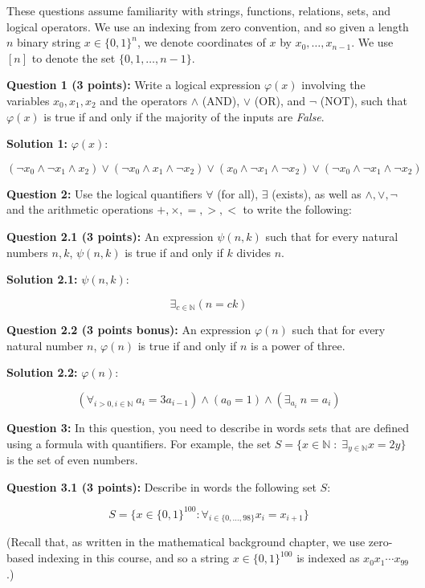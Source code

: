\documentclass[11pt]{article}
\newcommand{\N}{\ensuremath{\mathbb{N}}}
\begin{document}
These questions assume familiarity with strings, functions, relations,
sets, and logical operators. We use an indexing from zero convention,
and so given a length \(n\) binary string \(x\in \{0,1\}^n\), we denote
coordinates of \(x\) by \(x_0,\ldots,x_{n-1}\). We use \([n]\) to denote
the set \(\{0,1,\ldots,n-1\}\).

\textbf{Question 1 (3 points):} Write a logical expression
\(\varphi(x)\) involving the variables \(x_0,x_1,x_2\) and the operators
\(\wedge\) (AND), \(\vee\) (OR), and \(\neg\) (NOT), such that
\(\varphi(x)\) is true if and only if the majority of the inputs are
\emph{False}.

\textbf{Solution 1:} $\varphi(x):$

$$
(\neg x_0 \land \neg x_1 \land x_2) \lor (\neg x_0 \land x_1 \land \neg x_2)
\lor (x_0 \land \neg x_1 \land \neg x_2) \lor (\neg x_0 \land \neg x_1 \land
\neg x_2)
$$

\textbf{Question 2:} Use the logical quantifiers \(\forall\) (for all),
\(\exists\) (exists), as well as \(\wedge,\vee,\neg\) and the arithmetic
operations \(+,\times,=,>,<\) to write the following:

\textbf{Question 2.1 (3 points):} An expression \(\psi(n,k)\) such that
for every natural numbers \(n,k\), \(\psi(n,k)\) is true if and only if
\(k\) divides \(n\).

\textbf{Solution 2.1:} $\psi(n, k):$

$$
\exists_{c \in \N} (n = ck)
$$

\textbf{Question 2.2 (3 points bonus):} An expression \(\varphi(n)\)
such that for every natural number \(n\), \(\varphi(n)\) is true if and
only if \(n\) is a power of three.

\textbf{Solution 2.2:} $\varphi(n):$

$$
(\forall_{i > 0, i \in \N}\ a_i = 3a_{i-1}) \land (a_0 = 1) \land
(\exists_{a_i}\ n = a_i)
$$

\textbf{Question 3:} In this question, you need to describe in words
sets that are defined using a formula with quantifiers. For example, the
set \(S = \{ x\in \mathbb{N} \;:\; \exists_{y\in\mathbb{N}} x=2y \}\) is
the set of even numbers.

\textbf{Question 3.1 (3 points):} Describe in words the following set
\(S\):

\[
    S = \{ x\in \{0,1\}^{100} : \forall_{i\in \{0,\ldots, 98\}} x_i = x_{i+1} \}
\]

(Recall that, as written in the mathematical background chapter, we use
zero-based indexing in this course, and so a string
\(x\in \{0,1\}^{100}\) is indexed as \(x_0x_1\cdots x_{99}\).)
\end{document}
